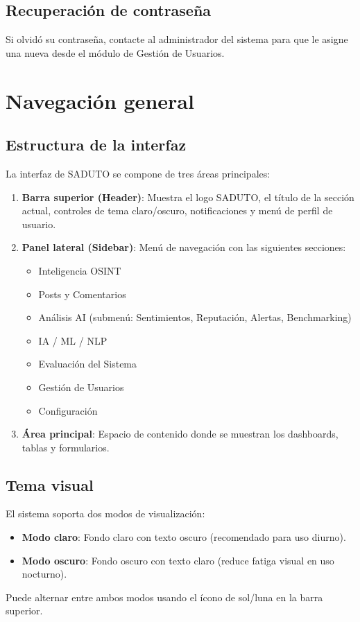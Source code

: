 \documentclass[12pt,a4paper]{article}
\begin{document}
\subsection{Recuperación de contraseña}
Si olvidó su contraseña, contacte al administrador del sistema para que le asigne una nueva desde el módulo de Gestión de Usuarios.

\section{Navegación general}

\subsection{Estructura de la interfaz}
La interfaz de SADUTO se compone de tres áreas principales:

\begin{enumerate}
  \item \textbf{Barra superior (Header)}: Muestra el logo SADUTO, el título de la sección actual, controles de tema claro/oscuro, notificaciones y menú de perfil de usuario.
  \item \textbf{Panel lateral (Sidebar)}: Menú de navegación con las siguientes secciones:
  \begin{itemize}
    \item Inteligencia OSINT
    \item Posts y Comentarios
    \item Análisis AI (submenú: Sentimientos, Reputación, Alertas, Benchmarking)
    \item IA / ML / NLP
    \item Evaluación del Sistema
    \item Gestión de Usuarios
    \item Configuración
  \end{itemize}
  \item \textbf{Área principal}: Espacio de contenido donde se muestran los dashboards, tablas y formularios.
\end{enumerate}

\subsection{Tema visual}
El sistema soporta dos modos de visualización:
\begin{itemize}
  \item \textbf{Modo claro}: Fondo claro con texto oscuro (recomendado para uso diurno).
  \item \textbf{Modo oscuro}: Fondo oscuro con texto claro (reduce fatiga visual en uso nocturno).
\end{itemize}
Puede alternar entre ambos modos usando el ícono de sol/luna en la barra superior.
\end{document}
